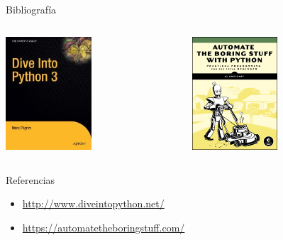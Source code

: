 \documentclass[bigger,unknownkeysallowed]{beamer}
\begin{document}
\begin{frame}[label={sec:org41331af}]{Bibliografía}
\begin{columns}
\begin{column}{0.5\columnwidth}
\begin{center}
\includegraphics[width=0.5\textwidth]{cover_Driveinto3.jpg}
\end{center}
\end{column}

\begin{column}{0.5\columnwidth}
\begin{center}
\includegraphics[width=0.5\textwidth]{cover_automate.png}
\end{center}
\end{column}
\end{columns}


\begin{block}{Referencias}
\begin{itemize}
\item \url{http://www.diveintopython.net/}
\item \url{https://automatetheboringstuff.com/}
\end{itemize}
\end{block}
\end{frame}
\end{document}
